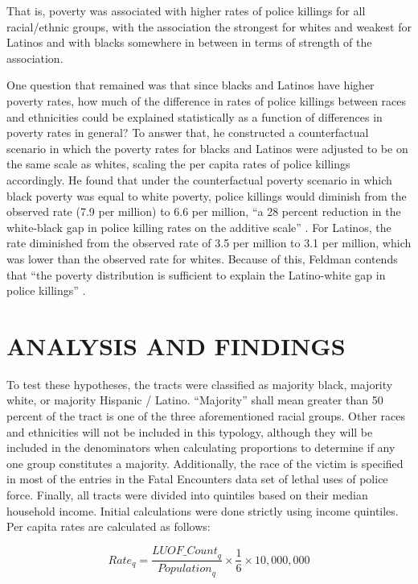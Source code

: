 \documentclass[12pt]{article}
\begin{document}
\noindent{}That is, poverty was associated with higher rates of police killings for all racial/ethnic groups, with the association the strongest for whites and weakest for Latinos and with blacks somewhere in between in terms of strength of the association.

One question that remained was that since blacks and Latinos have higher poverty rates, how much of the difference in rates of police killings between races and ethnicities could be explained statistically as a function of differences in poverty rates in general? To answer that, he constructed a counterfactual scenario in which the poverty rates for blacks and Latinos were adjusted to be on the same scale as whites, scaling the per capita rates of police killings accordingly. He found that under the counterfactual poverty scenario in which black poverty was equal to white poverty, police killings would diminish from the observed rate (7.9 per million) to 6.6 per million, “a 28 percent reduction in the white-black gap in police killing rates on the additive scale” \parencite{feldmanPoliceKillingsUS2020}. For Latinos, the rate diminished from the observed rate of 3.5 per million to 3.1 per million, which was lower than the observed rate for whites. Because of this, Feldman contends that “the poverty distribution is sufficient to explain the Latino-white gap in police killings” \parencite{feldmanPoliceKillingsUS2020}.

\section{ANALYSIS AND FINDINGS}

To test these hypotheses, the tracts were classified as majority black, majority white, or majority Hispanic / Latino. “Majority” shall mean greater than 50 percent of the tract is one of the three aforementioned racial groups. Other races and ethnicities will not be included in this typology, although they will be included in the denominators when calculating proportions to determine if any one group constitutes a majority. Additionally, the race of the victim is specified in most of the entries in the Fatal Encounters data set of lethal uses of police force. Finally, all tracts were divided into quintiles based on their median household income. Initial calculations were done strictly using income quintiles. Per capita rates are calculated as follows:

\begin{equation}
{Rate}_q=\frac{{LUOF\_Count}_q}{{Population}_q}\times\frac{1}{6}\times10,000,000
\label{eq:quintile_rate}
\end{equation}
\end{document}
